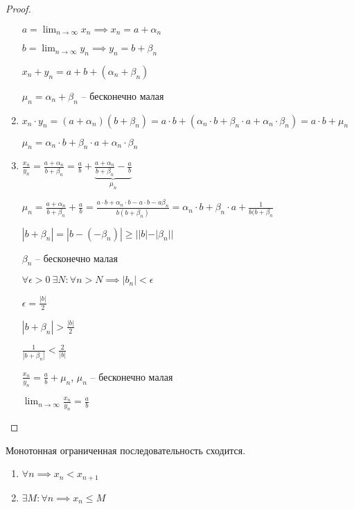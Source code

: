 \begin{proof}
\begin{enumerate}
        $a = \lim_{n \to \infty} x_n \implies x_n = a + \alpha_n$

        $b = \lim_{n \to \infty} y_n \implies y_n = b + \beta_n$

        $x_n + y_n = a + b + (\alpha_n + \beta_n)$

        $\mu_n = \alpha_n + \beta_n$ -- бесконечно малая
    \item
        $x_n \cdot y_n = (a + \alpha_n)(b + \beta_n) = a \cdot b + (\alpha_n \cdot b + \beta_n \cdot a + \alpha_n \cdot \beta_n) = a \cdot b + \mu_n$

        $\mu_n = \alpha_n \cdot b + \beta_n \cdot a + \alpha_n \cdot \beta_n$

    \item
        $\frac{x_n}{y_n} = \frac{a + \alpha_n}{b + \beta_n} = \frac{a}{b} + \underbrace{\frac{a + \alpha_n}{b + \beta_n} - \frac{a}{b}}_{\mu_n}$

        $\mu_n = \frac{a + \alpha_n}{b + \beta_n} + \frac{a}{b} = \frac{a \cdot b + \alpha_n \cdot b - a \cdot b - a \beta_n}{b(b + \beta_n)} = \alpha_n \cdot b + \beta_n \cdot a + \frac{1}{b(b + \beta_n}$

        $|b + \beta_n| = |b - (-\beta_n)| \geq ||b| - |\beta_n||$

        $\beta_n$ -- бесконечно малая

        $\forall \epsilon > 0 \ \exists N : \forall n > N \implies |b_n| < \epsilon$

        $\epsilon = \frac{|b|}{2}$

        $|b + \beta_n| > \frac{|b|}{2}$

        $\frac{1}{|b + \beta_n|} < \frac{2}{|b|}$

        $\frac{x_n}{y_n} = \frac{a}{b} + \mu_n$, $\mu_n$ -- бесконечно малая

        $\lim_{n \to \infty} \frac{x_n}{y_n} = \frac{a}{b}$
    \end{enumerate}
\end{proof}


\begin{theorem}
    Монотонная ограниченная последовательность сходится.
\end{theorem}

\begin{enumerate}
\item $\forall n \implies x_n < x_{n + 1}$
\item $\exists M : \forall n \implies x_n \leq M$
\end{enumerate}

